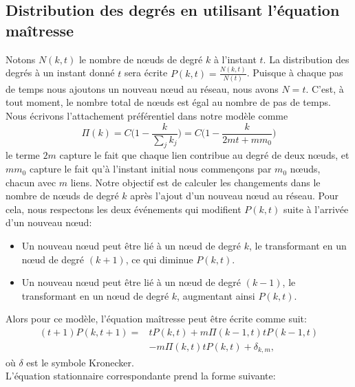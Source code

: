    \subsection{Distribution des degrés en utilisant l'équation maîtresse}
   Notons $N(k,t)$ le nombre de nœuds de degré $k$ à l'instant $t$. La distribution des degrés à un instant donné $t$ sera écrite $P(k,t)=\frac{N(k,t)}{N(t)}$. Puisque à chaque pas de temps nous ajoutons un nouveau nœud au réseau, nous avons $N=t$. C'est, à tout moment, le nombre total de nœuds est égal au nombre de pas de temps.\\
   Nous écrivons l'attachement préférentiel dans notre modèle comme
   \begin{equation}
   \Pi(k)=C\big(1-\frac{k}{\sum_jk_j}\big)=C\big(1-\frac{k}{2mt+mm_0}\big)
   \end{equation}
   le terme $2m$ capture le fait que chaque lien contribue au degré de deux nœuds, et $mm_0$ capture le fait qu'à l'instant initial nous commençons par $m_0$ nœuds, chacun avec $m$ liens. Notre objectif est de calculer les changements dans le nombre de nœuds de degré $k$ après l'ajout d'un nouveau nœud au réseau. Pour cela, nous respectons les deux événements qui modifient $P(k,t)$ suite à l'arrivée d'un nouveau nœud:
   \begin{itemize}
   	\item Un nouveau nœud peut être lié à un nœud de degré $k$, le transformant en un nœud de degré $(k+1)$, ce qui diminue $P(k,t)$.
   	\item Un nouveau nœud peut être lié à un nœud de degré $(k-1)$, le transformant en un nœud de degré $k$, augmentant ainsi $P(k,t)$.
   \end{itemize}
  Alors pour ce modèle, l'équation maîtresse peut être écrite comme suit:
   \begin{equation}
   \begin{aligned}
  (t+1)P(k,t+1)= &tP(k,t)+m\Pi(k-1,t)tP(k-1,t)\\
   & -m\Pi(k,t)tP(k,t)+\delta_{k,m},
  \end{aligned}
 \end{equation}
  où $\delta$ est le symbole Kronecker.\\
  L'équation stationnaire correspondante prend la forme suivante:
  
